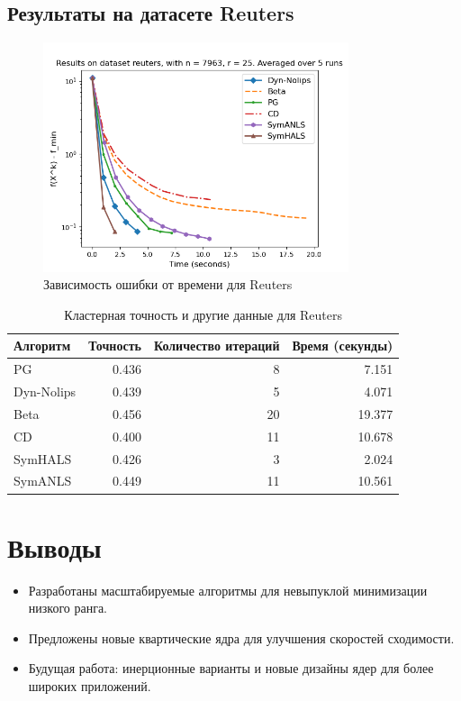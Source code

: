 \documentclass[a4paper,11pt]{article}
\begin{document}
\subsection{Результаты на датасете Reuters}
\begin{figure}[h!]
    \centering \includegraphics[width=0.8\textwidth]{my_plot_reuters.png}
    \caption{Зависимость ошибки от времени для Reuters}
    \label{fig:reuters}
\end{figure}
\begin{table}[h!]
    \centering
    \caption{Кластерная точность и другие данные для Reuters}
    \label{tab:clustering_accuracy_reuters}
    \begin{tabular}{|l|r|r|r|}
        \hline
        Алгоритм & Точность & Количество итераций & Время (секунды) \\
        \hline
        PG & 0.436 & 8 & 7.151 \\
        Dyn-Nolips & 0.439 & 5 & 4.071 \\
        Beta & 0.456 & 20 & 19.377 \\
        CD & 0.400 & 11 & 10.678 \\
        SymHALS & 0.426 & 3 & 2.024 \\
        SymANLS & 0.449 & 11 & 10.561 \\
        \hline
    \end{tabular}
\end{table}

\section{Выводы}
\begin{itemize}
    \item Разработаны масштабируемые алгоритмы для невыпуклой минимизации низкого ранга.
    \item Предложены новые квартические ядра для улучшения скоростей сходимости.
    \item Будущая работа: инерционные варианты и новые дизайны ядер для более широких приложений.
\end{itemize}
\end{document}
